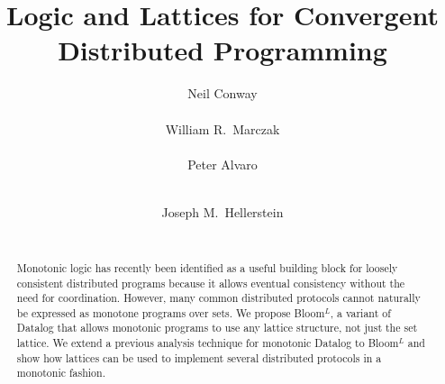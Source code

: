 \documentclass{vldb}
\def\lang{Bloom$^L$\xspace}
\begin{document}
\title{Logic and Lattices for Convergent\\Distributed Programming}


\author{
\alignauthor
Neil Conway\\
       \\
\alignauthor
William R.\ Marczak\\
       \\
\alignauthor
Peter Alvaro\\
       \\
\and
\alignauthor
Joseph M.\ Hellerstein\\
       \\
}

\maketitle

\begin{abstract}
  Monotonic logic has recently been identified as a useful building block for
  loosely consistent distributed programs because it allows eventual consistency
  without the need for coordination. However, many common distributed protocols
  cannot naturally be expressed as monotone programs over sets. We propose
  \lang, a variant of Datalog that allows monotonic programs to use any lattice
  structure, not just the set lattice. We extend a previous analysis technique
  for monotonic Datalog to \lang and show how lattices can be used to implement
  several distributed protocols in a monotonic fashion.
\end{abstract}










%




\newpage
\begin{appendix}

\end{appendix}
\end{document}
